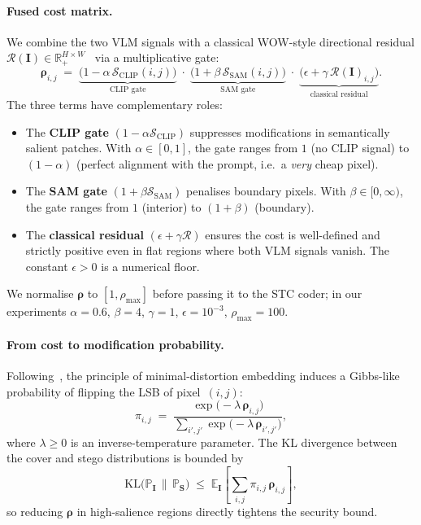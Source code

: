 \documentclass[10pt,a4paper]{article}
\newcommand{\R}{\mathbb{R}}
\newcommand{\cover}{\mathbf{I}}
\newcommand{\stego}{\mathbf{S}}
\newcommand{\cost}{\boldsymbol{\rho}}
\newcommand{\ScC}{\mathcal{S}_{\mathrm{CLIP}}}
\newcommand{\Ss}{\mathcal{S}_{\mathrm{SAM}}}
\newcommand{\KL}{\mathrm{KL}}
\newcommand{\Pc}{\mathbb{P}}
\begin{document}
\paragraph{Fused cost matrix.}
We combine the two VLM signals with a classical WOW-style directional
residual $\mathcal{R}(\cover) \in \R_+^{H \times W}$~\cite{holub2012wow}
via a multiplicative gate:
\begin{equation}
\boxed{
\cost_{i,j} \;=\;
\underbrace{\bigl( 1 - \alpha \, {\ScC}(i,j) \bigr)}_{\text{CLIP gate}}
\;\cdot\;
\underbrace{\bigl( 1 + \beta \, {\Ss}(i,j) \bigr)}_{\text{SAM gate}}
\;\cdot\;
\underbrace{\bigl( \epsilon + \gamma \, \mathcal{R}(\cover)_{i,j} \bigr)}_{\text{classical residual}}.
}
\label{eq:fused-cost}
\end{equation}
The three terms have complementary roles:
\begin{itemize}[leftmargin=2.2em,itemsep=1pt,topsep=2pt]
    \item The \textbf{CLIP gate} $(1 - \alpha \ScC)$ suppresses
          modifications in semantically salient patches. With
          $\alpha \in [0, 1]$, the gate ranges from $1$ (no CLIP signal)
          to $(1-\alpha)$ (perfect alignment with the prompt, i.e.\ a
          \emph{very} cheap pixel).
    \item The \textbf{SAM gate} $(1 + \beta \Ss)$ penalises boundary
          pixels. With $\beta \in [0, \infty)$, the gate ranges from
          $1$ (interior) to $(1+\beta)$ (boundary).
    \item The \textbf{classical residual} $(\epsilon + \gamma \mathcal{R})$
          ensures the cost is well-defined and strictly positive even in
          flat regions where both VLM signals vanish. The constant
          $\epsilon > 0$ is a numerical floor.
\end{itemize}
We normalise $\cost$ to $[1, \rho_{\max}]$ before passing it to the STC
coder; in our experiments $\alpha{=}0.6$, $\beta{=}4$, $\gamma{=}1$,
$\epsilon{=}10^{-3}$, $\rho_{\max}{=}100$.

\paragraph{From cost to modification probability.}
Following~\cite{filler2011stc}, the principle of minimal-distortion
embedding induces a Gibbs-like probability of flipping the LSB of
pixel~$(i,j)$:
\begin{equation}
\pi_{i,j} \;=\; \frac{\exp\bigl(-\lambda \, \cost_{i,j}\bigr)}
                     {\sum_{i',j'} \exp\bigl(-\lambda \, \cost_{i',j'}\bigr)},
\label{eq:gibbs}
\end{equation}
where $\lambda \geq 0$ is an inverse-temperature parameter. The
KL divergence between the cover and stego distributions is bounded by
\begin{equation}
\KL\!\bigl( \Pc_{\cover} \,\big\|\, \Pc_{\stego} \bigr)
\;\leq\;
\mathbb{E}_{\cover}\!\left[ \sum_{i,j} \pi_{i,j} \, \cost_{i,j} \right],
\label{eq:kl-bound}
\end{equation}
so reducing $\cost$ in high-salience regions directly tightens the
security bound.
\end{document}

